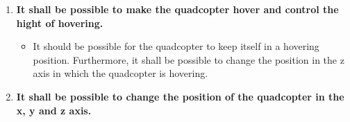 \begin{enumerate}[label=\textbf{\arabic*})]
\item \textbf{It shall be possible to make the quadcopter hover and control the hight of hovering.}
\begin{itemize}
\item[] It should be possible for the quadcopter to keep itself in a hovering position. Furthermore, it shall be possible to change the position in the z axis in which the quadcopter is hovering.
\end{itemize}

\item \textbf{It shall be possible to change the position of the quadcopter in the x, y and z axis.}
\end{enumerate}
%
%
%
%
%
%
%


